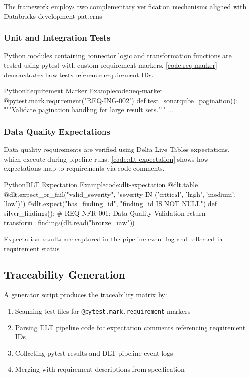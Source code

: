 The framework employs two complementary verification mechanisms aligned with Databricks development patterns.

\subsubsection{Unit and Integration Tests}

Python modules containing connector logic and transformation functions are tested using pytest with custom requirement markers. \autoref{code:req-marker} demonstrates how tests reference requirement IDs.

\begin{code}{Python}{Requirement Marker Example}{code:req-marker}
@pytest.mark.requirement("REQ-ING-002")
def test_sonarqube_pagination():
    """Validate pagination handling for large result sets."""
    ...
\end{code}

\subsubsection{Data Quality Expectations}

Data quality requirements are verified using Delta Live Tables expectations, which execute during pipeline runs. \autoref{code:dlt-expectation} shows how expectations map to requirements via code comments.

\begin{code}{Python}{DLT Expectation Example}{code:dlt-expectation}
@dlt.table
@dlt.expect_or_fail("valid_severity", "severity IN ('critical', 'high', 'medium', 'low')")
@dlt.expect("has_finding_id", "finding_id IS NOT NULL")
def silver_findings():
    # REQ-NFR-001: Data Quality Validation
    return transform_findings(dlt.read("bronze_raw"))
\end{code}

Expectation results are captured in the pipeline event log and reflected in requirement status.

\subsection{Traceability Generation}

A generator script produces the traceability matrix by:
\begin{enumerate}
    \item Scanning test files for \texttt{@pytest.mark.requirement} markers
    \item Parsing DLT pipeline code for expectation comments referencing requirement IDs
    \item Collecting pytest results and DLT pipeline event logs
    \item Merging with requirement descriptions from specification
\end{enumerate}



